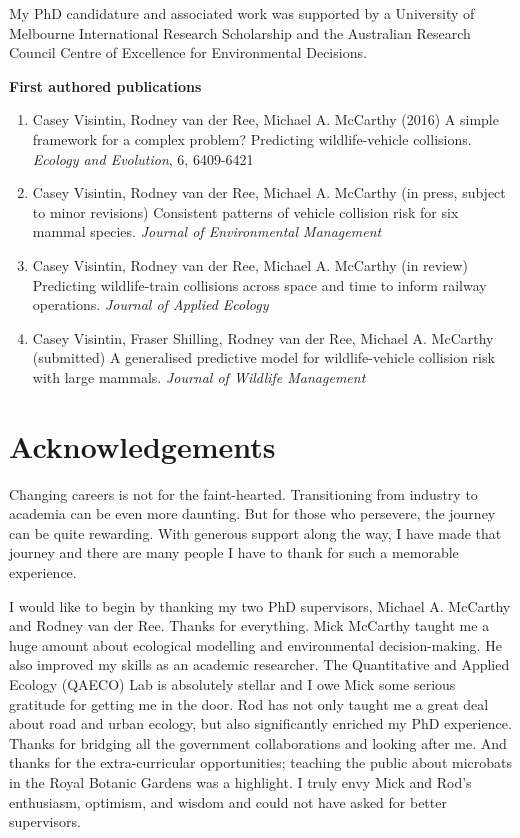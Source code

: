 \documentclass[titlesmallcaps,copyrightpage,examinerscopy]{uomthesis}
\begin{document}
My PhD candidature and associated work was supported by a University of Melbourne International Research Scholarship and the Australian Research Council Centre of Excellence for Environmental Decisions.

\newpage
\textbf{First authored publications}
\begin{enumerate}
\item Casey Visintin, Rodney van der Ree, Michael A. McCarthy (2016) A simple framework for a complex problem?  Predicting wildlife-vehicle collisions. \textit{Ecology and Evolution}, 6, 6409-6421

\item Casey Visintin, Rodney van der Ree, Michael A. McCarthy (in press, subject to minor revisions) Consistent patterns of vehicle collision risk for six mammal species. \textit{Journal of Environmental Management}

\item Casey Visintin, Rodney van der Ree, Michael A. McCarthy (in review) Predicting wildlife-train collisions across space and time to inform railway operations. \textit{Journal of Applied Ecology}

\item Casey Visintin, Fraser Shilling, Rodney van der Ree, Michael A. McCarthy (submitted) A generalised predictive model for wildlife-vehicle collision risk with large mammals. \textit{Journal of Wildlife Management}
\end{enumerate}
\clearpage{\pagestyle{empty}\cleardoublepage}

\chapter{Acknowledgements}

Changing careers is not for the faint-hearted. Transitioning from industry to academia can be even more daunting. But for those who persevere, the journey can be quite rewarding. With generous support along the way, I have made that journey and there are many people I have to thank for such a memorable experience.

I would like to begin by thanking my two PhD supervisors, Michael A. McCarthy and Rodney van der Ree. Thanks for everything. Mick McCarthy taught me a huge amount about ecological modelling and environmental decision-making. He also improved my skills as an academic researcher. The Quantitative and Applied Ecology (QAECO) Lab is absolutely stellar and I owe Mick some serious gratitude for getting me in the door. Rod has not only taught me a great deal about road and urban ecology, but also significantly enriched my PhD experience. Thanks for bridging all the government collaborations and looking after me. And thanks for the extra-curricular opportunities; teaching the public about microbats in the Royal Botanic Gardens was a highlight. I truly envy Mick and Rod's enthusiasm, optimism, and wisdom and could not have asked for better supervisors.
\end{document}
